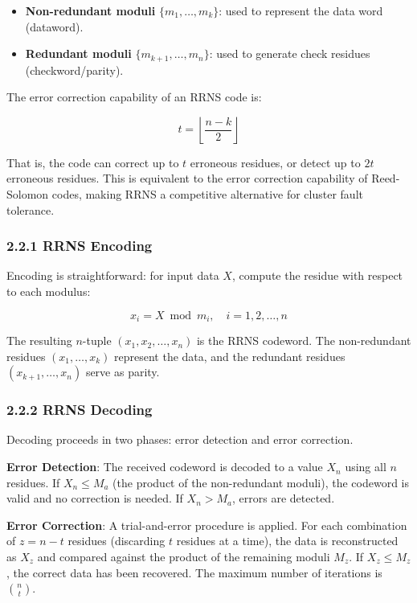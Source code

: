 \begin{itemize}
\tightlist
\item
  \textbf{Non-redundant moduli} \(\{m_1, \ldots, m_k\}\): used to
  represent the data word (dataword).
\item
  \textbf{Redundant moduli} \(\{m_{k+1}, \ldots, m_n\}\): used to
  generate check residues (checkword/parity).
\end{itemize}

The error correction capability of an RRNS code is:

\[t = \left\lfloor \frac{n - k}{2} \right\rfloor\]

That is, the code can correct up to \(t\) erroneous residues, or detect
up to \(2t\) erroneous residues. This is equivalent to the error
correction capability of Reed-Solomon codes, making RRNS a competitive
alternative for cluster fault tolerance.

\subsubsection{2.2.1 RRNS Encoding}\label{rrns-encoding}

Encoding is straightforward: for input data \(X\), compute the residue
with respect to each modulus:

\[x_i = X \bmod m_i, \quad i = 1, 2, \ldots, n\]

The resulting \(n\)-tuple \((x_1, x_2, \ldots, x_n)\) is the RRNS
codeword. The non-redundant residues \((x_1, \ldots, x_k)\) represent
the data, and the redundant residues \((x_{k+1}, \ldots, x_n)\) serve as
parity.

\subsubsection{2.2.2 RRNS Decoding}\label{rrns-decoding}

Decoding proceeds in two phases: error detection and error correction.

\textbf{Error Detection}: The received codeword is decoded to a value
\(X_n\) using all \(n\) residues. If \(X_n \leq M_a\) (the product of
the non-redundant moduli), the codeword is valid and no correction is
needed. If \(X_n > M_a\), errors are detected.

\textbf{Error Correction}: A trial-and-error procedure is applied. For
each combination of \(z = n - t\) residues (discarding \(t\) residues at
a time), the data is reconstructed as \(X_z\) and compared against the
product of the remaining moduli \(M_z\). If \(X_z \leq M_z\), the
correct data has been recovered. The maximum number of iterations is
\(\binom{n}{t}\).

